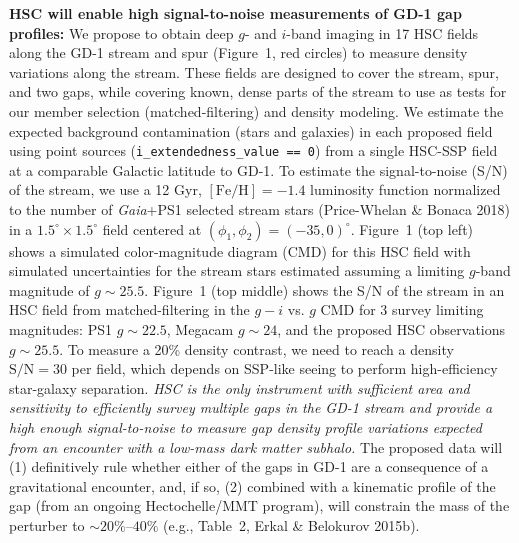 \documentclass[11pt]{article}
\begin{document}
\textbf{HSC will enable high signal-to-noise measurements of GD-1 gap profiles:}
We propose to obtain deep $g$- and $i$-band imaging in 17 HSC fields along the GD-1 stream and spur (Figure~1, red circles) to measure density variations along the stream.
These fields are designed to cover the stream, spur, and two gaps, while covering known, dense parts of the stream to use as tests for our member selection (matched-filtering) and density modeling.
We estimate the expected background contamination (stars and galaxies) in each proposed field using point sources (\texttt{i\_extendedness\_value == 0}) from a single HSC-SSP field at a comparable Galactic latitude to GD-1.
To estimate the signal-to-noise (S/N) of the stream, we use a 12 Gyr, $[\textrm{Fe}/\textrm{H}] = -1.4$ luminosity function normalized to the number of \textit{Gaia}+PS1 selected stream stars (Price-Whelan \& Bonaca 2018) in a $1.5^\circ \times 1.5^\circ$ field centered at $(\phi_1, \phi_2) = (-35, 0)^\circ$.
Figure~1 (top left) shows a simulated color-magnitude diagram (CMD) for this HSC field with simulated uncertainties for the stream stars estimated assuming a limiting $g$-band magnitude of $g \sim 25.5$.
Figure~1 (top middle) shows the S/N of the stream in an HSC field from matched-filtering in the $g-i$ vs. $g$ CMD for 3 survey limiting magnitudes: PS1 $g \sim 22.5$, Megacam $g \sim 24$, and the proposed HSC observations $g \sim 25.5$.
To measure a 20\% density contrast, we need to reach a density $\textrm{S}/\textrm{N} = 30$ per field, which depends on SSP-like seeing to perform high-efficiency star-galaxy separation.
\emph{HSC is the only instrument with sufficient area and sensitivity to efficiently survey multiple gaps in the GD-1 stream and provide a high enough signal-to-noise to measure gap density profile variations expected from an encounter with a low-mass dark matter subhalo.}
The proposed data will (1) definitively rule whether either of the gaps in GD-1 are a consequence of a gravitational encounter, and, if so, (2) combined with a kinematic profile of the gap (from an ongoing Hectochelle/MMT program), will constrain the mass of the perturber to $\sim 20\%$--$40\%$ (e.g., Table~2, Erkal \& Belokurov 2015b).
\end{document}
